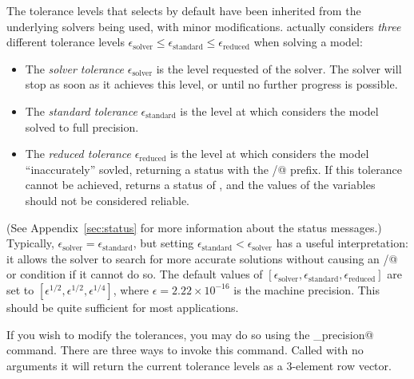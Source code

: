 \documentclass[12pt]{article}
\begin{document}
The tolerance levels that \cvx selects by default have been inherited from the 
underlying solvers being used, with minor modifications. \cvx actually considers
\emph{three} different tolerance levels 
$\epsilon_{\text{solver}}\leq\epsilon_{\text{standard}}\leq\epsilon_{\text{reduced}}$
when solving a model:
\begin{itemize}
\item The \emph{solver tolerance} $\epsilon_{\text{solver}}$ is the level requested
      of the solver. The solver will stop as soon as it achieves this level, or until
      no further progress is possible.
\item The \emph{standard tolerance} $\epsilon_{\text{standard}}$ is the level at which \cvx considers the model solved
      to full precision.
\item The \emph{reduced tolerance} $\epsilon_{\text{reduced}}$ 
      is the level at which \cvx considers the model ``inaccurately'' sovled,
      returning a status with the \verb@Inaccurate/@ prefix. If this tolerance
      cannot be achieved, \cvx returns a status of \verb@Failed@, and the
      values of the variables should not be considered reliable.
\end{itemize}
(See Appendix~\ref{sec:status} for more information about the status messages.)
Typically,
$\epsilon_{\text{solver}}=\epsilon_{\text{standard}}$, but
setting $\epsilon_{\text{standard}}<\epsilon_{\text{solver}}$ has a useful
interpretation: it allows the solver to search for more accurate solutions
without causing an \verb@Inaccurate/@ or \verb@Failed@ condition if it cannot do
so. 
The default values of $[\epsilon_{\text{solver}},\epsilon_{\text{standard}},\epsilon_{\text{reduced}}]$
are set to $[ \epsilon^{1/2}, \epsilon^{1/2}, \epsilon^{1/4} ]$, where 
$\epsilon=2.22\times10^{-16}$ is the machine precision. This should be quite
sufficient for most applications. 

If you wish to modify the tolerances,
you may do so using the \verb@cvx_precision@ command.
There are three ways to invoke this command.
Called with no arguments it will return the
current tolerance levels as a 3-element row vector.
\end{document}
